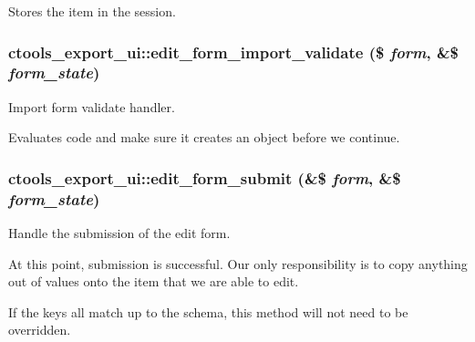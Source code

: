 Stores the item in the session. \hypertarget{classctools__export__ui_aa518c562943a8face0d6c65473e96567}{
\subsubsection[{edit\_\-form\_\-import\_\-validate}]{\setlength{\rightskip}{0pt plus 5cm}ctools\_\-export\_\-ui::edit\_\-form\_\-import\_\-validate (\$ {\em form}, \/  \&\$ {\em form\_\-state})}}
\label{classctools__export__ui_aa518c562943a8face0d6c65473e96567}
Import form validate handler.

Evaluates code and make sure it creates an object before we continue. \hypertarget{classctools__export__ui_ad63b402977462073eade789265987139}{
\subsubsection[{edit\_\-form\_\-submit}]{\setlength{\rightskip}{0pt plus 5cm}ctools\_\-export\_\-ui::edit\_\-form\_\-submit (\&\$ {\em form}, \/  \&\$ {\em form\_\-state})}}
\label{classctools__export__ui_ad63b402977462073eade789265987139}
Handle the submission of the edit form.

At this point, submission is successful. Our only responsibility is to copy anything out of values onto the item that we are able to edit.

If the keys all match up to the schema, this method will not need to be overridden. 


